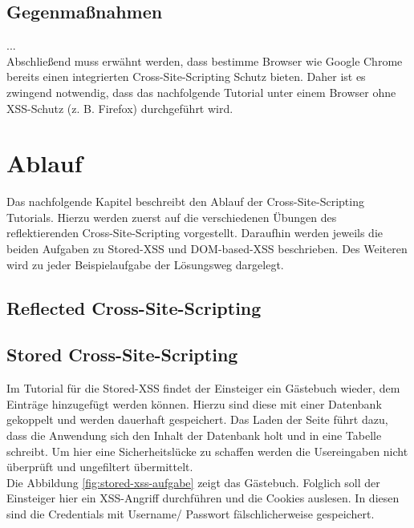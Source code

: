 \subsection{Gegenmaßnahmen}
... \\ 
Abschließend muss erwähnt werden, dass bestimme Browser wie Google Chrome bereits einen integrierten Cross-Site-Scripting Schutz bieten. Daher ist es zwingend notwendig, dass das nachfolgende Tutorial unter einem Browser ohne XSS-Schutz (z. B. Firefox) durchgeführt wird. 

\section{Ablauf}
Das nachfolgende Kapitel beschreibt den Ablauf der Cross-Site-Scripting Tutorials. Hierzu werden zuerst auf die verschiedenen Übungen des reflektierenden Cross-Site-Scripting vorgestellt. Daraufhin werden jeweils die beiden Aufgaben zu Stored-XSS und DOM-based-XSS beschrieben. Des Weiteren wird zu jeder Beispielaufgabe der Lösungsweg dargelegt. 

\subsection{Reflected Cross-Site-Scripting}

\subsection{Stored Cross-Site-Scripting}
Im Tutorial für die Stored-XSS findet der Einsteiger ein Gästebuch wieder, dem Einträge hinzugefügt werden können. Hierzu sind diese mit einer Datenbank gekoppelt und werden dauerhaft gespeichert. Das Laden der Seite führt dazu, dass die Anwendung sich den Inhalt der Datenbank holt und in eine Tabelle schreibt. Um hier eine Sicherheitslücke zu schaffen werden die Usereingaben nicht überprüft und ungefiltert übermittelt. \\ 
Die Abbildung \ref{fig:stored-xss-aufgabe} zeigt das Gästebuch. Folglich soll der Einsteiger hier ein XSS-Angriff durchführen und die Cookies auslesen. In diesen sind die Credentials mit Username/ Passwort fälschlicherweise gespeichert. \\ 

